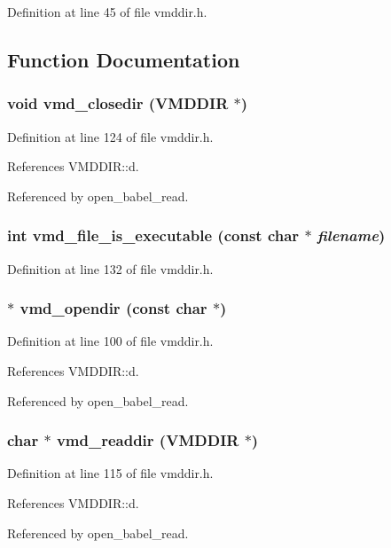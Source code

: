 Definition at line 45 of file vmddir.h.

\subsection{Function Documentation}
\subsubsection{\setlength{\rightskip}{0pt plus 5cm}void vmd\_\-closedir ({\bf VMDDIR} $\ast$)\hspace{0.3cm}{\tt  [static]}}\label{vmddir_8h_a3}




Definition at line 124 of file vmddir.h.

References VMDDIR::d.

Referenced by open\_\-babel\_\-read.
\subsubsection{\setlength{\rightskip}{0pt plus 5cm}int vmd\_\-file\_\-is\_\-executable (const char $\ast$ {\em filename})\hspace{0.3cm}{\tt  [static]}}\label{vmddir_8h_a4}




Definition at line 132 of file vmddir.h.
\subsubsection{ $\ast$ vmd\_\-opendir (const char $\ast$)\hspace{0.3cm}{\tt  [static]}}\label{vmddir_8h_a1}




Definition at line 100 of file vmddir.h.

References VMDDIR::d.

Referenced by open\_\-babel\_\-read.
\subsubsection{\setlength{\rightskip}{0pt plus 5cm}char $\ast$ vmd\_\-readdir ({\bf VMDDIR} $\ast$)\hspace{0.3cm}{\tt  [static]}}\label{vmddir_8h_a2}




Definition at line 115 of file vmddir.h.

References VMDDIR::d.

Referenced by open\_\-babel\_\-read.